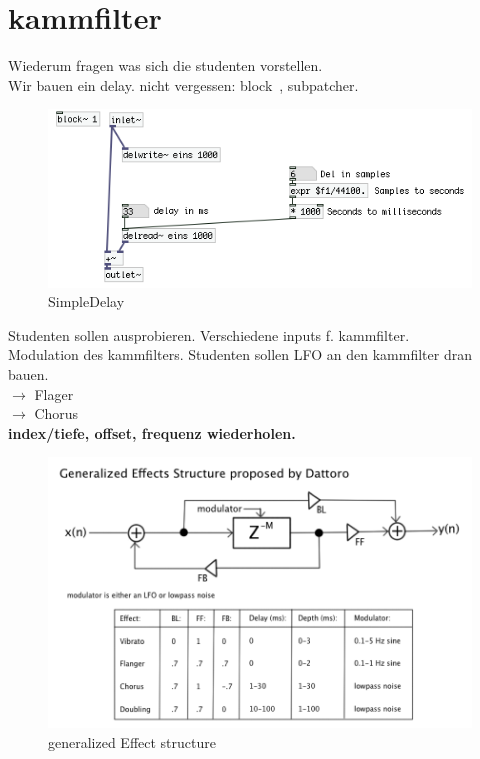 \section {kammfilter}

Wiederum fragen was sich die studenten vorstellen.\\


\glqq{}Wir bauen ein delay.\grqq{}
nicht vergessen: block~, subpatcher.


\begin{figure}[h]
	\begin{center}
		\includegraphics[width = 14cm]{simpleDelay.png}
		\caption{SimpleDelay}
		\label{fig:simpleDelay}
	\end{center}
\end{figure}

Studenten sollen ausprobieren. Verschiedene inputs f. kammfilter. \\

Modulation des kammfilters. Studenten sollen LFO an den kammfilter dran bauen.\\
\(\rightarrow\) Flager \\
\(\rightarrow\) Chorus \\

\textbf{index/tiefe, offset, frequenz wiederholen.}


\begin{figure}[h]
	\begin{center}
		\includegraphics[width = 14cm]{generalizedEffect.png}
		\caption{generalized Effect structure}
		\label{fig:genEffect}
	\end{center}
\end{figure}

